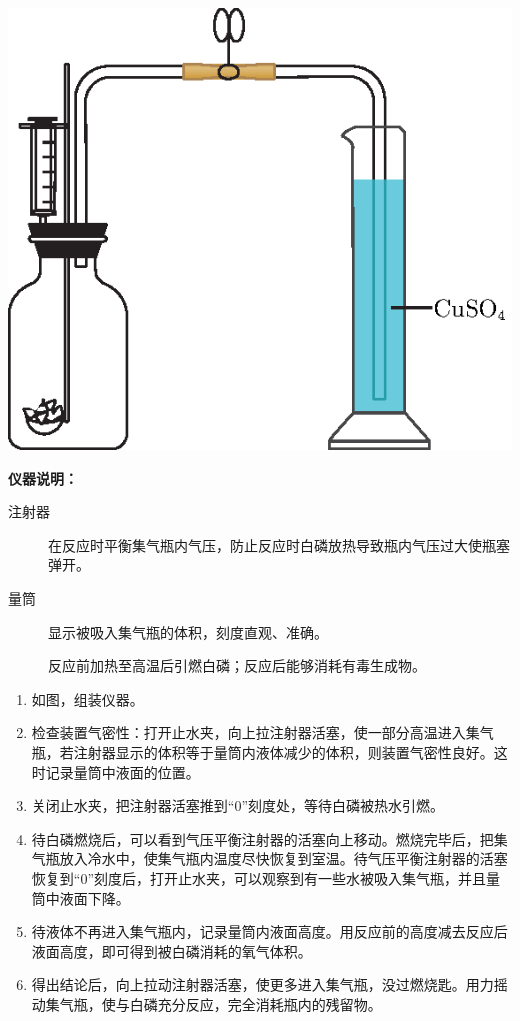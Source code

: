 \documentclass[11pt,a4paper,titlepage,twocolumn]{ctexart}
\begin{document}
	\begin{center}
		\includegraphics[width=0.6\linewidth]{fig/6}
	\end{center}
	
	\noindent\textbf{仪器说明：} \indent\par
	\begin{description}
		\item[注射器] 在反应时平衡集气瓶内气压，防止反应时白磷放热导致瓶内气压过大使瓶塞弹开。
		\item[量筒] 显示被吸入集气瓶的体积，刻度直观、准确。
		\item[] 反应前加热至高温后引燃白磷；反应后能够消耗有毒生成物。
	\end{description}
	
	\begin{enumerate}
		\item 如图，组装仪器。
		\item 检查装置气密性：打开止水夹，向上拉注射器活塞，使一部分高温进入集气瓶，若注射器显示的体积等于量筒内液体减少的体积，则装置气密性良好。这时记录量筒中液面的位置。
		\item 关闭止水夹，把注射器活塞推到``0''刻度处，等待白磷被热水引燃。
		\item 待白磷燃烧后，可以看到气压平衡注射器的活塞向上移动。燃烧完毕后，把集气瓶放入冷水中，使集气瓶内温度尽快恢复到室温。待气压平衡注射器的活塞恢复到``0''刻度后，打开止水夹，可以观察到有一些水被吸入集气瓶，并且量筒中液面下降。
		\item 待液体不再进入集气瓶内，记录量筒内液面高度。用反应前的高度减去反应后液面高度，即可得到被白磷消耗的氧气体积。
		\item 得出结论后，向上拉动注射器活塞，使更多进入集气瓶，没过燃烧匙。用力摇动集气瓶，使与白磷充分反应，完全消耗瓶内的残留物。
	\end{enumerate}
	
\end{document}
